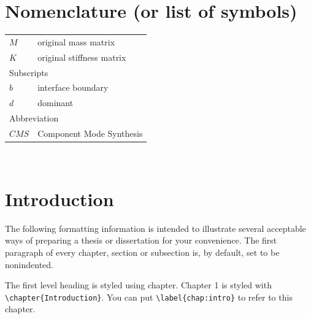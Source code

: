 \documentclass{report}
\begin{document}
\listoftables

\listoffigures

\chapter*{Nomenclature (or list of symbols)}
\begin{tabular}{p{}p{}}
$M$	& original mass matrix\\
$K$	& original stiffness matrix\\[30pt]
\multicolumn{2}{l}{Subscripts}\\
$b$ & interface boundary\\
$d$ & dominant\\[30pt]
\multicolumn{2}{l}{Abbreviation}\\
$CMS$ & Component Mode Synthesis\\
\end{tabular}

\newpage 
~%

\chapter{Introduction}\label{chap:intro}
The following formatting information is intended to illustrate several acceptable ways of preparing a thesis or dissertation for your convenience.
The first paragraph of every chapter, section or subsection is, by default, set to be nonindented.

The first level heading is styled using chapter.
Chapter 1 is styled with\\ \verb|\chapter{Introduction}|.
You can put \verb|\label{chap:intro}| to refer to this chapter.
\end{document}
